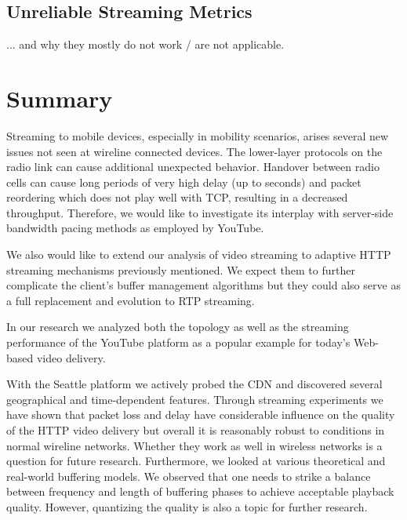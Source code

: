 \subsection{Unreliable Streaming Metrics}
... and why they mostly do not work / are not applicable.










\section{Summary}
\label{c3:sec:conclusion}

Streaming to mobile devices, especially in mobility scenarios, arises several new issues not seen at wireline connected devices. The lower-layer protocols on the radio link can cause additional unexpected behavior. Handover between radio cells can cause long periods of very high delay (up to seconds) and packet reordering which does not play well with TCP, resulting in a decreased throughput. Therefore, we would like to investigate its interplay with server-side bandwidth pacing methods as employed by YouTube.

We also would like to extend our analysis of video streaming to adaptive HTTP streaming mechanisms previously mentioned. We expect them to further complicate the client's buffer management algorithms but they could also serve as a full replacement and evolution to RTP streaming.

In our research we analyzed both the topology as well as the streaming performance of the YouTube platform as a popular example for today's Web-based video delivery. 

With the Seattle platform we actively probed the CDN and discovered several geographical and time-dependent features. Through streaming experiments we have shown that packet loss and delay have considerable influence on the quality of the HTTP video delivery but overall it is reasonably robust to conditions in normal wireline networks. Whether they work as well in wireless networks is a question for future research. Furthermore, we looked at various theoretical and real-world buffering models. We observed that one needs to strike a balance between frequency and length of buffering phases to achieve acceptable playback quality. However, quantizing the quality is also a topic for further research.

